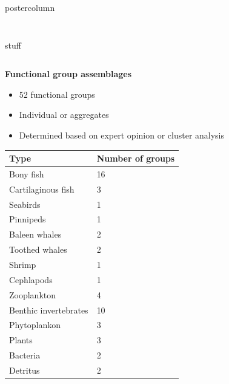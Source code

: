 \documentclass[final,hyperref={pdfpagelabels=false}]{beamer}
\begin{document}
\begin{frame}
\begin{columns}
\begin{column}{1\textwidth}
\begin{beamercolorbox}[center,wd=\textwidth]{postercolumn}
\begin{minipage}[T]{.98\textwidth}
{\begin{block}{}
\begin{columns}
\begin{column}{.15\textwidth}
\begin{figure}
                \footnotesize
                   \end{figure}
                   \end{column}
              \end{columns}
            \end{block}
            
            \vspace{1cm}
            \begin{block}{stuff}
            \begin{columns}
            \begin{column}{.49\textwidth}
            
            \centering \textbf{Functional group assemblages}
            
            \begin{itemize}
            	\item 52 functional groups
		\item Individual or aggregates
		\item Determined based on expert opinion or cluster analysis
            \end{itemize}
            
            \begin{center}
            \begin{tabular}{p{.5\linewidth}p{.3\linewidth}}
            \hline
            Type & Number of groups \\
            \hline
            Bony fish & 16 \\
            Cartilaginous fish & 3 \\
            Seabirds & 1 \\
            Pinnipeds & 1 \\
            Baleen whales & 2 \\
            Toothed whales & 2\\
            Shrimp & 1 \\
            Cephlapods & 1\\
            Zooplankton & 4 \\
            Benthic invertebrates & 10 \\
            Phytoplankon & 3 \\
            Plants & 3 \\
            Bacteria & 2 \\
            Detritus & 2\\
            \hline
            \end{tabular}
            \end{center}
           

\end{column}
\end{columns}
\end{block}}
\end{minipage}
\end{beamercolorbox}
\end{column}
\end{columns}
\end{frame}
\end{document}
